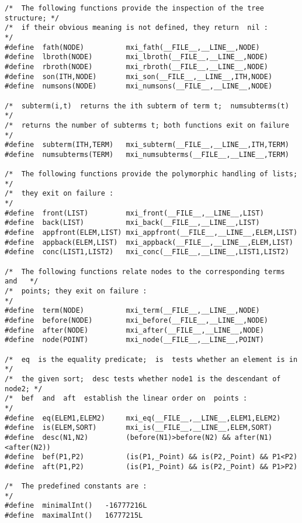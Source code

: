 \begin{verbatim}
/*  The following functions provide the inspection of the tree structure; */
/*  if their obvious meaning is not defined, they return  nil :           */
#define  fath(NODE)          mxi_fath(__FILE__,__LINE__,NODE)
#define  lbroth(NODE)        mxi_lbroth(__FILE__,__LINE__,NODE)
#define  rbroth(NODE)        mxi_rbroth(__FILE__,__LINE__,NODE)
#define  son(ITH,NODE)       mxi_son(__FILE__,__LINE__,ITH,NODE)
#define  numsons(NODE)       mxi_numsons(__FILE__,__LINE__,NODE)

/*  subterm(i,t)  returns the ith subterm of term t;  numsubterms(t)      */
/*  returns the number of subterms t; both functions exit on failure      */
#define  subterm(ITH,TERM)   mxi_subterm(__FILE__,__LINE__,ITH,TERM)
#define  numsubterms(TERM)   mxi_numsubterms(__FILE__,__LINE__,TERM)

/*  The following functions provide the polymorphic handling of lists;    */
/*  they exit on failure :                                                */
#define  front(LIST)         mxi_front(__FILE__,__LINE__,LIST)
#define  back(LIST)          mxi_back(__FILE__,__LINE__,LIST)
#define  appfront(ELEM,LIST) mxi_appfront(__FILE__,__LINE__,ELEM,LIST)
#define  appback(ELEM,LIST)  mxi_appback(__FILE__,__LINE__,ELEM,LIST)
#define  conc(LIST1,LIST2)   mxi_conc(__FILE__,__LINE__,LIST1,LIST2)

/*  The following functions relate nodes to the corresponding terms and   */
/*  points; they exit on failure :                                        */
#define  term(NODE)          mxi_term(__FILE__,__LINE__,NODE)
#define  before(NODE)        mxi_before(__FILE__,__LINE__,NODE)
#define  after(NODE)         mxi_after(__FILE__,__LINE__,NODE)
#define  node(POINT)         mxi_node(__FILE__,__LINE__,POINT)

/*  eq  is the equality predicate;  is  tests whether an element is in    */
/*  the given sort;  desc tests whether node1 is the descendant of node2; */
/*  bef  and  aft  establish the linear order on  points :                */
#define  eq(ELEM1,ELEM2)     mxi_eq(__FILE__,__LINE__,ELEM1,ELEM2)
#define  is(ELEM,SORT)       mxi_is(__FILE__,__LINE__,ELEM,SORT)
#define  desc(N1,N2)         (before(N1)>before(N2) && after(N1)<after(N2))
#define  bef(P1,P2)          (is(P1,_Point) && is(P2,_Point) && P1<P2)
#define  aft(P1,P2)          (is(P1,_Point) && is(P2,_Point) && P1>P2)

/*  The predefined constants are :                                        */
#define  minimalInt()   -16777216L
#define  maximalInt()   16777215L


\end{verbatim}
